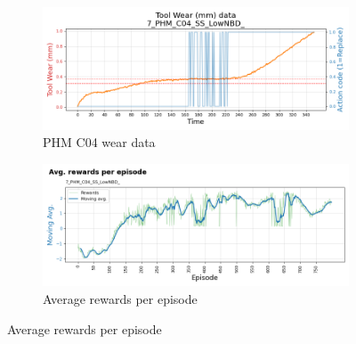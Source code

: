 \documentclass[a4paper, 12pt]{article}
\begin{document}
\begin{figure}[h]
	\begin{subfigure}[b]{0.5\textwidth}
		\centering
		\includegraphics[width=\textwidth]{images/TrainingPlots/7_PHM_C04_SS_LowNBD__wear_plot.png}  
		\caption{PHM C04 wear data}
		\label{fig:C04wear}
	\end{subfigure}
	\hfill
	\begin{subfigure}[b]{0.5\textwidth}
		\centering
		\includegraphics[width=\textwidth]{images/TrainingPlots/7_PHM_C04_SS_LowNBD__Avg_episode_rewards.png}  
		\caption{Average rewards per episode}
		\label{fig:C04rewards}
	\end{subfigure} \par\bigskip
	

\end{figure}
\end{document}
